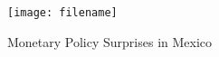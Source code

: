 \documentclass{article}
\begin{document}
\begin{figure}[tbph]
	\caption{Monetary Policy Surprises in Mexico} \label{fig:factorslines}
	\begin{center}									%
		\begin{minipage}{0.9\linewidth}
			\begin{center}							%
				\texttt{[image: filename]} \\
			\end{center}
		\end{minipage}
	\end{center}
\end{figure}


%				
\end{document}
